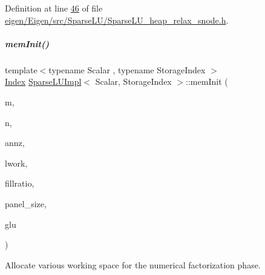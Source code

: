 Definition at line \hyperlink{eigen_2_eigen_2src_2_sparse_l_u_2_sparse_l_u__heap__relax__snode_8h_source_l00046}{46} of file \hyperlink{eigen_2_eigen_2src_2_sparse_l_u_2_sparse_l_u__heap__relax__snode_8h_source}{eigen/\+Eigen/src/\+Sparse\+L\+U/\+Sparse\+L\+U\+\_\+heap\+\_\+relax\+\_\+snode.\+h}.

\mbox{\label{group___sparse_l_u___module_ac018b8ed9664d4e19e34f1ff2d6c578a}} 
\subparagraph{\texorpdfstring{mem\+Init()}{memInit()}}
{\footnotesize\ttfamily template$<$typename Scalar , typename Storage\+Index $>$ \\
\hyperlink{namespace_eigen_a62e77e0933482dafde8fe197d9a2cfde}{Index} \hyperlink{group___sparse_l_u___module_class_eigen_1_1internal_1_1_sparse_l_u_impl}{Sparse\+L\+U\+Impl}$<$ Scalar, Storage\+Index $>$\+::mem\+Init (\begin{DoxyParamCaption}\item[{\hyperlink{namespace_eigen_a62e77e0933482dafde8fe197d9a2cfde}{Index}}]{m,  }\item[{\hyperlink{namespace_eigen_a62e77e0933482dafde8fe197d9a2cfde}{Index}}]{n,  }\item[{\hyperlink{namespace_eigen_a62e77e0933482dafde8fe197d9a2cfde}{Index}}]{annz,  }\item[{\hyperlink{namespace_eigen_a62e77e0933482dafde8fe197d9a2cfde}{Index}}]{lwork,  }\item[{\hyperlink{namespace_eigen_a62e77e0933482dafde8fe197d9a2cfde}{Index}}]{fillratio,  }\item[{\hyperlink{namespace_eigen_a62e77e0933482dafde8fe197d9a2cfde}{Index}}]{panel\+\_\+size,  }\item[{\hyperlink{struct_eigen_1_1internal_1_1_l_u___global_l_u__t}{Global\+L\+U\+\_\+t} \&}]{glu }\end{DoxyParamCaption})\hspace{0.3cm}{\ttfamily [protected]}}



Allocate various working space for the numerical factorization phase. 


